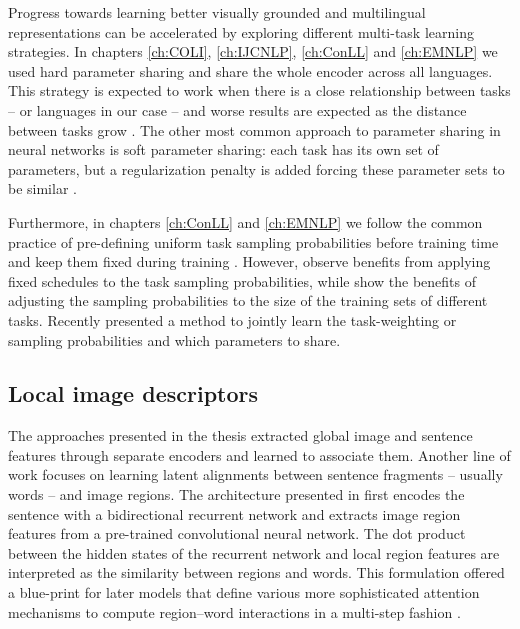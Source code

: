 Progress towards learning better visually grounded and multilingual representations
can be accelerated by exploring different multi-task learning strategies. 
In chapters \ref{ch:COLI}, \ref{ch:IJCNLP}, \ref{ch:ConLL} and \ref{ch:EMNLP}
we used hard parameter sharing \citep{caruana1997multitask,collobert2011natural}
and share the whole encoder across all languages. This strategy is expected to work when there is a close
relationship between tasks \citep{baxter2000model} -- or languages in our case  -- and worse results 
are expected as the distance between tasks grow \citep{maurer2006bounds}. 
The other most common approach to parameter sharing in neural networks is soft parameter sharing:
each task has its
own set of parameters, but a regularization penalty is added forcing these parameter sets to be similar \citep{duong2015low,yang2016trace}.

Furthermore, in chapters \ref{ch:ConLL} and \ref{ch:EMNLP} we follow the common practice of
pre-defining uniform task sampling probabilities 
before training time and keep them fixed during training \citep{alonso2016multitask,bingel2017identifying}.
However, \cite{kiperwasser2018scheduled} observe benefits from applying fixed schedules to 
the task sampling probabilities, while \cite{sanh2018hierarchical} show the benefits of adjusting the
sampling probabilities to the size of the training sets of different tasks.  Recently \cite{ruder2017sluice}
presented a method to jointly learn the task-weighting or sampling probabilities and which parameters
to share.

\subsection{Local image descriptors}

The approaches presented in the thesis extracted global image and sentence features through separate
encoders and learned to associate them. Another line of work focuses on learning latent alignments
between sentence fragments -- usually words -- and image regions. The architecture presented in 
\citep{karpathy2015deep} first encodes the sentence with a bidirectional recurrent network and extracts
image region features from a pre-trained convolutional neural network. The dot product between 
the hidden states of the recurrent network and local region features are interpreted as the similarity
between regions and words. This formulation offered a blue-print for later models that define various
more sophisticated attention mechanisms to compute region--word interactions in a multi-step fashion
 \citep{nam2017dual,huang2017instance}.


